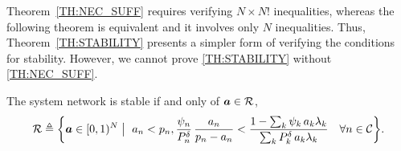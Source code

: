Theorem~\ref{TH:NEC_SUFF} requires verifying $N\!\times\!N!$ inequalities, whereas the following theorem is equivalent and it involves only $N$ inequalities.
%
Thus, Theorem~\ref{TH:STABILITY} presents a simpler form of verifying the conditions for stability.
However, we cannot prove \ref{TH:STABILITY} without \ref{TH:NEC_SUFF}.

\begin{theorem} \label{TH:STABILITY}
	The system network is stable if and only of $\bm{a}\in\mathcal{R}$,
    \begin{align*}
    	\mathcal{R}
        \triangleq \bigg\{ \bm{a}\in[0,1)^N \bigm\vert ~ a_n < p_n, \dfrac{\psi_n}{P_n^\delta}\,\dfrac{a_n}{p_n-a_n} < 
        \dfrac{1 - \sum_{k} \psi_k\,a_k \lambda_k}
        {\sum_{k} P_k^{\delta}\,a_k \lambda_k} 
        \quad\forall n \in \mathcal{C}  \bigg\}.
    \end{align*}
\end{theorem}


